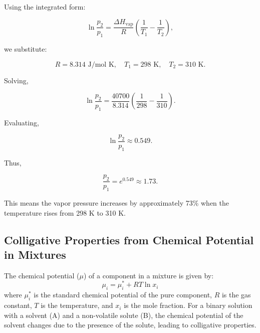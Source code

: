 \documentclass{article}
\theoremstyle{definition}
\begin{document}
Using the integrated form:

\begin{equation}
\ln \frac{p_2}{p_1} = \frac{\Delta H_{\text{vap}}}{R} \left( \frac{1}{T_1} - \frac{1}{T_2} \right),
\end{equation}

we substitute:

\begin{equation}
R = 8.314 \text{ J/mol K}, \quad T_1 = 298 \text{ K}, \quad T_2 = 310 \text{ K}.
\end{equation}

Solving,

\begin{equation}
\ln \frac{p_2}{p_1} = \frac{40700}{8.314} \left( \frac{1}{298} - \frac{1}{310} \right).
\end{equation}

Evaluating,

\begin{equation}
\ln \frac{p_2}{p_1} \approx 0.549.
\end{equation}

Thus,

\begin{equation}
\frac{p_2}{p_1} = e^{0.549} \approx 1.73.
\end{equation}

This means the vapor pressure increases by approximately 73\% when the temperature rises from 298 K to 310 K.
\subsection{Colligative Properties from Chemical Potential in Mixtures}
The chemical potential (\(\mu\)) of a component in a mixture is given by:
\begin{equation}
    \mu_i = \mu_i^* + RT \ln x_i
\end{equation}
where \(\mu_i^*\) is the standard chemical potential of the pure component, \(R\) is the gas constant, \(T\) is the temperature, and \(x_i\) is the mole fraction.
For a binary solution with a solvent (A) and a non-volatile solute (B), the chemical potential of the solvent changes due to the presence of the solute, leading to colligative properties.
\end{document}

